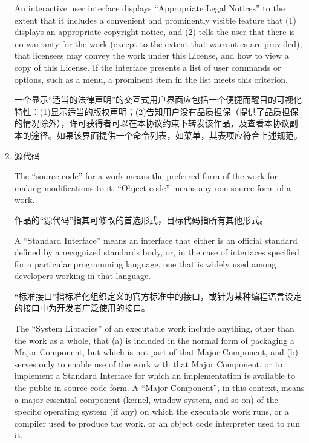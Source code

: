 \documentclass[11pt]{article}
\begin{document}
\begin{enumerate}
        An interactive user interface displays ``Appropriate Legal Notices''
        to the extent that it includes a convenient and prominently visible
        feature that (1) displays an appropriate copyright notice, and (2)
        tells the user that there is no warranty for the work (except to the
        extent that warranties are provided), that licensees may convey the
        work under this License, and how to view a copy of this License.  If
        the interface presents a list of user commands or options, such as a
        menu, a prominent item in the list meets this criterion.

        一个显示“适当的法律声明”的交互式用户界面应包括一个便捷而醒目的可视化特性：(1)显示适当的版权声明；(2)告知用户没有品质担保（提供了品质担保的情况除外），许可获得者可以在本协议约束下转发该作品，及查看本协议副本的途径。如果该界面提供一个命令列表，如菜单，其表项应符合上述规范。


  \item 源代码

        The ``source code'' for a work means the preferred form of the work
        for making modifications to it.  ``Object code'' means any non-source
        form of a work.

        作品的“源代码”指其可修改的首选形式，目标代码指所有其他形式。

        A ``Standard Interface'' means an interface that either is an official
        standard defined by a recognized standards body, or, in the case of
        interfaces specified for a particular programming language, one that
        is widely used among developers working in that language.

        “标准接口”指标准化组织定义的官方标准中的接口，或针为某种编程语言设定的接口中为开发者广泛使用的接口。

        The ``System Libraries'' of an executable work include anything, other
        than the work as a whole, that (a) is included in the normal form of
        packaging a Major Component, but which is not part of that Major
        Component, and (b) serves only to enable use of the work with that
        Major Component, or to implement a Standard Interface for which an
        implementation is available to the public in source code form.  A
        ``Major Component'', in this context, means a major essential component
        (kernel, window system, and so on) of the specific operating system
        (if any) on which the executable work runs, or a compiler used to
        produce the work, or an object code interpreter used to run it.


\end{enumerate}
\end{document}
